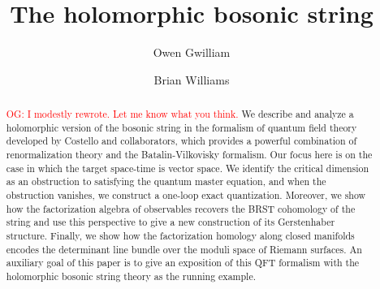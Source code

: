 \documentclass{conm-p-l}
\theoremstyle{definition}
\theoremstyle{remark}
\numberwithin{equation}{section}
\def\owen{\textcolor{red}{OG: }\textcolor{red}}
\begin{document}
\title{The holomorphic bosonic string}

\author{Owen Gwilliam}
\address{Max Planck Institute for Mathematics, Bonn, Germany}

\author{Brian Williams}
\address{Department of Mathematics, Northwestern University, Evanston, IL}

\date{}

\begin{abstract}
\owen{I modestly rewrote. Let me know what you think.}
We describe and analyze a holomorphic version of the bosonic string in the formalism of quantum field theory developed by Costello and collaborators, which provides a powerful combination of renormalization theory and the Batalin-Vilkovisky formalism. Our focus here is on the case in which the target space-time is vector space. We identify the critical dimension as an obstruction to satisfying the quantum master equation, and when the obstruction vanishes, we construct a one-loop exact quantization. Moreover, we show how the factorization algebra of observables recovers the BRST cohomology of the string and use this perspective to give a new construction of its Gerstenhaber structure. Finally, we show how the factorization homology along closed manifolds encodes the determinant line bundle over the moduli space of Riemann surfaces.
An auxiliary goal of this paper is to give an exposition of this QFT formalism with the holomorphic bosonic string theory as the running example.
\end{abstract}

\maketitle


\setcounter{tocdepth}{1}

\tableofcontents














\end{document}
